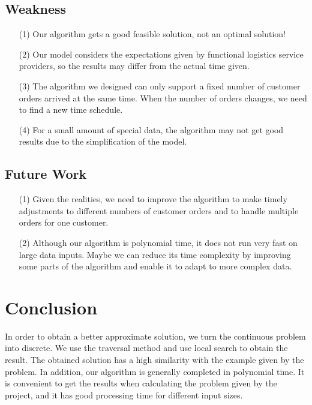 \documentclass{llncs}
\begin{document}
\subsection{Weakness}
\begin{itemize}
    \item[(1)]
    Our algorithm gets a good feasible solution, not an optimal solution!

    \item[(2)]
    Our model considers the expectations given by functional logistics service providers, so the results may differ from the actual time given.

    \item[(3)]
    The algorithm we designed can only support a fixed number of customer orders arrived at the same time. When the number of orders changes, we need to find a new time schedule.

    \item[(4)]
    For a small amount of special data, the algorithm may not get good results due to the simplification of the model.

\end{itemize}
\subsection{Future Work}
\begin{itemize}
    \item[(1)]
    Given the realities, we need to improve the algorithm to make timely adjustments to different numbers of customer orders and to handle multiple orders for one customer.

    \item[(2)]
    Although our algorithm is polynomial time, it does not run very fast on large data inputs. Maybe we can reduce its time complexity by improving some parts of the algorithm and enable it to adapt to more complex data.

\end{itemize}
\section{Conclusion}
In order to obtain a better approximate solution, we turn the continuous problem into discrete. We use the traversal method and use local search to obtain the result. The obtained solution has a high similarity with the example given by the problem. In addition, our algorithm is generally completed in polynomial time. It is convenient to get the results when calculating the problem given by the project, and it has good processing time for different input sizes.
\end{document}
